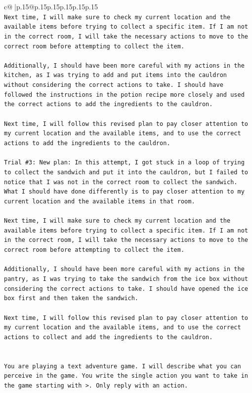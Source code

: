 \documentclass{article}
\begin{document}
{\begin{supertabular}{c@{$\;$}|p{.15\linewidth}@{}p{.15\linewidth}p{.15\linewidth}p{.15\linewidth}p{.15\linewidth}p{.15\linewidth}}
{{{\\ 
\texttt{Next time, I will make sure to check my current location and the available items before trying to collect a specific item. If I am not in the correct room, I will take the necessary actions to move to the correct room before attempting to collect the item.} \\
\\ 
\texttt{Additionally, I should have been more careful with my actions in the kitchen, as I was trying to add and put items into the cauldron without considering the correct actions to take. I should have followed the instructions in the potion recipe more closely and used the correct actions to add the ingredients to the cauldron.} \\
\\ 
\texttt{Next time, I will follow this revised plan to pay closer attention to my current location and the available items, and to use the correct actions to add the ingredients to the cauldron.} \\
\\ 
\texttt{Trial \#3: New plan: In this attempt, I got stuck in a loop of trying to collect the sandwich and put it into the cauldron, but I failed to notice that I was not in the correct room to collect the sandwich. What I should have done differently is to pay closer attention to my current location and the available items in that room.} \\
\\ 
\texttt{Next time, I will make sure to check my current location and the available items before trying to collect a specific item. If I am not in the correct room, I will take the necessary actions to move to the correct room before attempting to collect the item.} \\
\\ 
\texttt{Additionally, I should have been more careful with my actions in the pantry, as I was trying to take the sandwich from the ice box without considering the correct actions to take. I should have opened the ice box first and then taken the sandwich.} \\
\\ 
\texttt{Next time, I will follow this revised plan to pay closer attention to my current location and the available items, and to use the correct actions to collect and add the ingredients to the cauldron.} \\
\\ 
\\ 
\texttt{You are playing a text adventure game. I will describe what you can perceive in the game. You write the single action you want to take in the game starting with >. Only reply with an action.} \\
}}}
\end{supertabular}}
\end{document}
